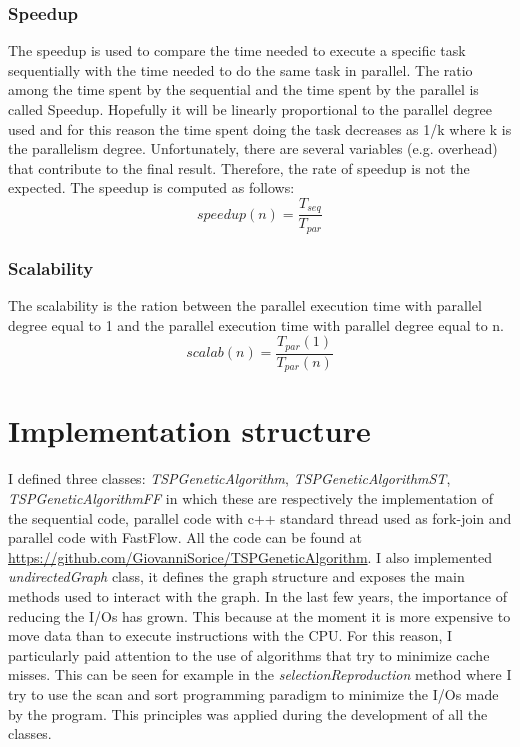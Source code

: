 \documentclass[a4paper,10pt]{article}
\begin{document}
	\subsubsection{Speedup}
	The speedup is used to compare the time needed to execute a specific task sequentially with the time needed to do the same task in parallel. The ratio among the time spent by the sequential and the time spent by the parallel is called Speedup. Hopefully it will be linearly proportional to the parallel degree used and for this reason the time spent doing the task decreases as 1/k where k is the parallelism degree. Unfortunately, there are several variables (e.g. overhead) that contribute to the final result. Therefore, the rate of speedup is not the expected.
	The speedup is computed as follows:
	\begin{equation}
	speedup(n)=\frac{T_{seq}}{T_{par}}
	\end{equation}
	
	\subsubsection{Scalability}
	The scalability is the ration between the parallel execution time with parallel degree equal to 1 and the parallel execution time with parallel degree equal to n.
		\begin{equation}
	scalab(n)=\frac{T_{par}(1)}{T_{par}(n)}
	\end{equation}
	\section{Implementation structure}
	I defined three classes: \textit{TSPGeneticAlgorithm}, \textit{TSPGeneticAlgorithmST}, \textit{TSPGeneticAlgorithmFF} in which these are respectively the implementation of the sequential code, parallel code with c++ standard thread used as fork-join and parallel code with FastFlow.
	All the code can be found at \url{https://github.com/GiovanniSorice/TSPGeneticAlgorithm}.
	I also implemented \textit{undirectedGraph} class, it defines the graph structure and exposes the main methods used to interact with the graph.
	In the last few years, the importance of reducing the I/Os has grown. This because at the moment it is more expensive to move data than to execute instructions with the CPU. For this reason, I particularly paid attention to the use of algorithms that try to minimize cache misses. This can be seen for example in the \textit{selectionReproduction} method where I try to use the scan and sort programming paradigm to minimize the I/Os made by the program. This principles was applied during the development of all the classes.
\end{document}
